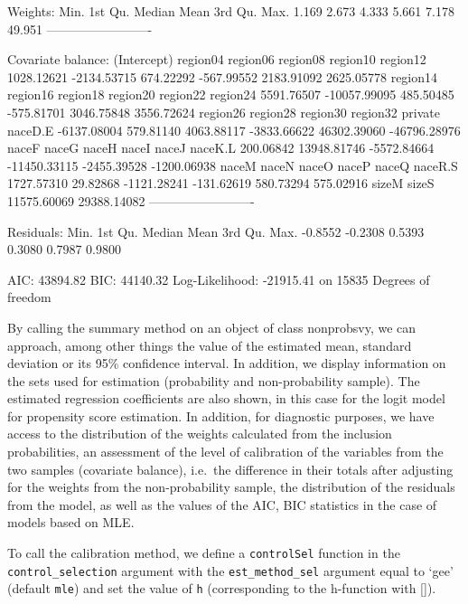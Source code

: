 \documentclass[
]{jss}
\begin{document}
\begin{CodeChunk}
\begin{CodeOutput}
Weights:
   Min. 1st Qu.  Median    Mean 3rd Qu.    Max. 
  1.169   2.673   4.333   5.661   7.178  49.951 
-------------------------

Covariate balance:
 (Intercept)     region04     region06     region08     region10     region12 
  1028.12621  -2134.53715    674.22292   -567.99552   2183.91092   2625.05778 
    region14     region16     region18     region20     region22     region24 
  5591.76507 -10057.99095    485.50485   -575.81701   3046.75848   3556.72624 
    region26     region28     region30     region32      private      naceD.E 
 -6137.08004    579.81140   4063.88117  -3833.66622  46302.39060 -46796.28976 
       naceF        naceG        naceH        naceI        naceJ      naceK.L 
   200.06842  13948.81746  -5572.84664 -11450.33115  -2455.39528  -1200.06938 
       naceM        naceN        naceO        naceP        naceQ      naceR.S 
  1727.57310     29.82868  -1121.28241   -131.62619    580.73294    575.02916 
       sizeM        sizeS 
 11575.60069  29388.14082 
-------------------------

Residuals:
   Min. 1st Qu.  Median    Mean 3rd Qu.    Max. 
-0.8552 -0.2308  0.5393  0.3080  0.7987  0.9800 

AIC: 43894.82
BIC: 44140.32
Log-Likelihood: -21915.41 on 15835 Degrees of freedom
\end{CodeOutput}
\end{CodeChunk}

By calling the summary method on an object of class nonprobsvy, we can
approach, among other things the value of the estimated mean, standard
deviation or its 95\% confidence interval. In addition, we display
information on the sets used for estimation (probability and
non-probability sample). The estimated regression coefficients are also
shown, in this case for the logit model for propensity score estimation.
In addition, for diagnostic purposes, we have access to the distribution
of the weights calculated from the inclusion probabilities, an
assessment of the level of calibration of the variables from the two
samples (covariate balance), i.e.~the difference in their totals after
adjusting for the weights from the non-probability sample, the
distribution of the residuals from the model, as well as the values of
the AIC, BIC statistics in the case of models based on MLE.

To call the calibration method, we define a \texttt{controlSel} function
in the \texttt{control\_selection} argument with the
\texttt{est\_method\_sel} argument equal to `gee' (default \texttt{mle})
and set the value of \texttt{h} (corresponding to the h-function with
\ref{}).
\end{document}
